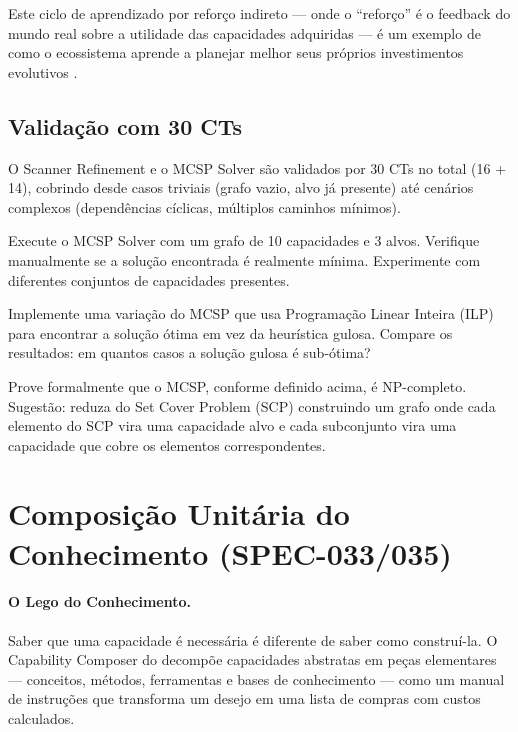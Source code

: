 Este ciclo de aprendizado por reforço indireto --- onde o ``reforço'' é
o feedback do mundo real sobre a utilidade das capacidades adquiridas ---
é um exemplo de como o ecossistema aprende a planejar melhor seus próprios
investimentos evolutivos \cite{shinn2023reflexion}.

\subsection{Validação com 30 CTs}

O Scanner Refinement e o MCSP Solver são validados por 30 CTs no total
(16 + 14), cobrindo desde casos triviais (grafo vazio, alvo já presente)
até cenários complexos (dependências cíclicas, múltiplos caminhos mínimos).

\begin{exercicio}
Execute o MCSP Solver com um grafo de 10 capacidades e 3 alvos. Verifique
manualmente se a solução encontrada é realmente mínima. Experimente com
diferentes conjuntos de capacidades presentes.
\end{exercicio}

\begin{exercicio}
Implemente uma variação do MCSP que usa Programação Linear Inteira (ILP)
para encontrar a solução ótima em vez da heurística gulosa. Compare os
resultados: em quantos casos a solução gulosa é sub-ótima?
\end{exercicio}

\begin{exercicio}
Prove formalmente que o MCSP, conforme definido acima, é NP-completo.
Sugestão: reduza do Set Cover Problem (SCP) construindo um grafo onde
cada elemento do SCP vira uma capacidade alvo e cada subconjunto vira
uma capacidade que cobre os elementos correspondentes.
\end{exercicio}

\section{Composição Unitária do Conhecimento (SPEC-033/035)}
\label{sec:composicao-unitaria}
\nivelphd

\paragraph{O Lego do Conhecimento.} Saber que uma capacidade é necessária é diferente de saber como construí-la. O Capability Composer do \opencodeeco{} decompõe capacidades abstratas em peças elementares --- conceitos, métodos, ferramentas e bases de conhecimento --- como um manual de instruções que transforma um desejo em uma lista de compras com custos calculados.

